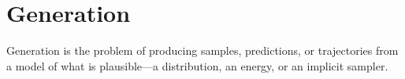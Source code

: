 \part{Generation}
\label{part:generation}

Generation is the problem of producing samples, predictions, or trajectories from a model of what is plausible---a distribution, an energy, or an implicit sampler.
